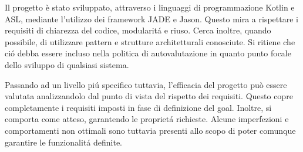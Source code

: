 Il progetto \`e stato sviluppato, attraverso i linguaggi di programmazione Kotlin e ASL, mediante l'utilizzo dei framework JADE e Jason. Questo mira a rispettare i requisiti di chiarezza del codice, modularit\'a e riuso. Cerca inoltre, quando possibile, di utilizzare pattern e strutture architetturali conosciute. Si ritiene che ci\'o debba essere incluso nella politica di autovalutazione in quanto punto focale dello sviluppo di qualsiasi sistema.

\parag
Passando ad un livello pi\'u specifico tuttavia, l’efficacia del progetto pu\`o essere valutata analizzandolo dal punto di vista del rispetto dei requisiti. Questo copre completamente i requisiti imposti in fase di definizione del goal. Inoltre, si comporta come atteso, garantendo le propriet\'a richieste. Alcune imperfezioni e comportamenti non ottimali sono tuttavia presenti allo scopo di poter comunque garantire le funzionalit\'a definite.
